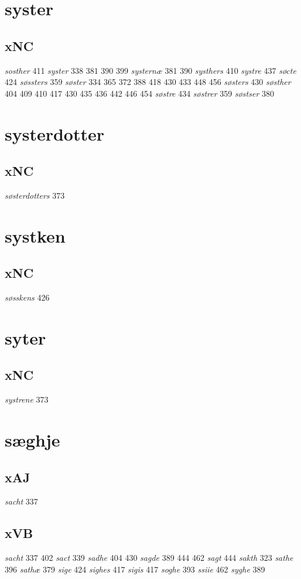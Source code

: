 \documentclass[a4paper,twocolumn]{article}
\begin{document}
\section{syster}
\label{sec:org5f33296}
\subsection{xNC}
\label{sec:orgaefb6e6}
\emph{sosther} 411 \emph{syster} 338 381 390 399 \emph{systernæ} 381 390 \emph{systhers} 410 \emph{systre} 437 \emph{søcte} 424 \emph{søssters} 359 \emph{søster} 334 365 372 388 418 430 433 448 456 \emph{søsters} 430 \emph{søsther} 404 409 410 417 430 435 436 442 446 454 \emph{søstre} 434 \emph{søstrer} 359 \emph{søstser} 380 
\section{systerdotter}
\label{sec:org3b405d0}
\subsection{xNC}
\label{sec:org7af9267}
\emph{søsterdotters} 373 
\section{systken}
\label{sec:orgcb2ae77}
\subsection{xNC}
\label{sec:org69fedc7}
\emph{søsskens} 426 
\section{syter}
\label{sec:orgadd25c6}
\subsection{xNC}
\label{sec:orgc70c65b}
\emph{systrene} 373 
\section{sæghje}
\label{sec:orgeaf36dd}
\subsection{xAJ}
\label{sec:orgd9f416c}
\emph{sacht} 337 
\subsection{xVB}
\label{sec:orgd11d175}
\emph{sacht} 337 402 \emph{sact} 339 \emph{sadhe} 404 430 \emph{sagde} 389 444 462 \emph{sagt} 444 \emph{sakth} 323 \emph{sathe} 396 \emph{sathæ} 379 \emph{sige} 424 \emph{sighes} 417 \emph{sigis} 417 \emph{soghe} 393 \emph{ssiie} 462 \emph{syghe} 389 
\end{document}
